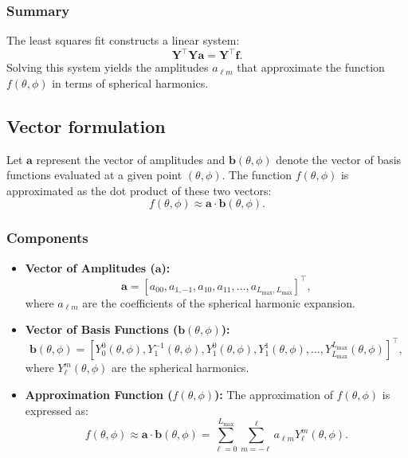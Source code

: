 \subsubsection*{Summary}
The least squares fit constructs a linear system:
\[
\mathbf{Y}^\top \mathbf{Y} \mathbf{a} = \mathbf{Y}^\top \mathbf{f}.
\]
Solving this system yields the amplitudes $a_{\ell m}$ that approximate the function $f(\theta, \phi)$ in terms of spherical harmonics.

\subsection{Vector formulation}

Let \( \mathbf{a} \) represent the vector of amplitudes and \( \mathbf{b}(\theta, \phi) \) denote the vector of basis functions evaluated at a given point \( (\theta, \phi) \). The function \( f(\theta, \phi) \) is approximated as the dot product of these two vectors:
\[
f(\theta, \phi) \approx \mathbf{a} \cdot \mathbf{b}(\theta, \phi).
\]

\subsubsection*{Components}
\begin{itemize}
    \item \textbf{Vector of Amplitudes (\( \mathbf{a} \)):}
    \[
    \mathbf{a} = [a_{00}, a_{1,-1}, a_{10}, a_{11}, \dots, a_{L_{\text{max}},L_{\text{max}}}]^\top,
    \]
    where \( a_{\ell m} \) are the coefficients of the spherical harmonic expansion.

    \item \textbf{Vector of Basis Functions (\( \mathbf{b}(\theta, \phi) \)):}
    \[
    \mathbf{b}(\theta, \phi) = [Y_0^0(\theta, \phi), Y_1^{-1}(\theta, \phi), Y_1^0(\theta, \phi), Y_1^1(\theta, \phi), \dots, Y_{L_{\text{max}}}^{L_{\text{max}}}(\theta, \phi)]^\top,
    \]
    where \( Y_\ell^m(\theta, \phi) \) are the spherical harmonics.

    \item \textbf{Approximation Function (\( f(\theta, \phi) \)):}
    The approximation of \( f(\theta, \phi) \) is expressed as:
    \[
    f(\theta, \phi) \approx \mathbf{a} \cdot \mathbf{b}(\theta, \phi) = \sum_{\ell=0}^{L_{\text{max}}} \sum_{m=-\ell}^\ell a_{\ell m} Y_\ell^m(\theta, \phi).
    \]
\end{itemize}

